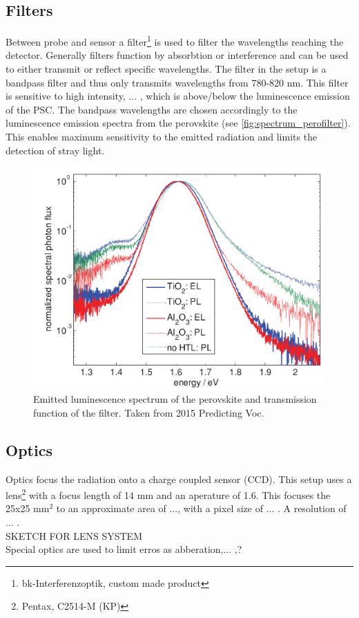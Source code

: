\subsection{Filters}
Between probe and sensor a filter\footnote{bk-Interferenzoptik, custom made product} is used to filter the wavelengths reaching the detector. Generally filters function by absorbtion or interference and can be used to either transmit or reflect specific wavelengths. The filter in the setup is a bandpass filter and thus only transmits wavelengths from 780-820 nm. This filter is sensitive to high intensity, ... , which is above/below the luminescence emission of the PSC. The bandpass wavelengths are chosen accordingly to the luminescence emission spectra from the perovskite (see \autoref{fig:spectrum_perofilter}). This enables maximum sensitivity to the emitted radiation and limits the detection of stray light.

\begin{figure}
	\centering
	\includegraphics[width=0.7\linewidth]{Images/ExperimentalSetup/Perovskite_Spectrum}
	\caption{Emitted luminescence spectrum of the perovskite and transmission function of the filter. Taken from 2015 Predicting Voc.}
	\label{fig:spectrum_perofilter}
\end{figure}
\subsection{Optics}
Optics focus the radiation onto a charge coupled sensor (CCD). This setup uses a lens\footnote{Pentax, C2514-M (KP)} with a focus length of 14 mm and an aperature of 1.6. This focuses the 25x25 mm$^2$ to an approximate area of ..., with a pixel size of ... . A resolution of ... . 
\\
SKETCH FOR LENS SYSTEM
\\
Special optics are used to limit erros as abberation,... ,?

